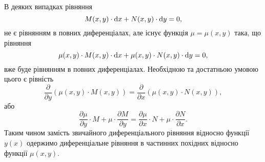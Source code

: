 В деяких випадках рівняння
\begin{equation*}
	M(x, y) \cdot \mathop{}\!\mathrm{d} x + N(x, y) \cdot \mathop{}\!\mathrm{d} y = 0,
\end{equation*}
не є рівнянням в повних диференціалах, але існує функція $\mu = \mu(x,y)$ така, що рівняння
\begin{equation*}
	\mu(x,y) \cdot M(x, y) \cdot \mathop{}\!\mathrm{d} x + \mu(x,y) \cdot N(x, y) \cdot \mathop{}\!\mathrm{d} y = 0,
\end{equation*}
вже буде рівнянням в повних диференціалах. Необхідною та достатньою умовою цього є рівність
\begin{equation*}
	\frac{\partial}{\partial y} (\mu(x,y) \cdot M(x, y)) = \frac{\partial}{\partial x} (\mu(x,y) \cdot N(x, y)),
\end{equation*}
або
\begin{equation*}
	\frac{\partial \mu}{\partial y} \cdot M + \mu \cdot \frac{\partial M}{\partial y} = \frac{\partial \mu}{\partial x} \cdot N + \mu \cdot \frac{\partial N}{\partial x}.
\end{equation*}
Таким чином замість звичайного диференціального рівняння відносно функції $y(x)$ одержимо диференціальне рівняння в частинних похідних відносно функції $\mu(x, y)$. \\

